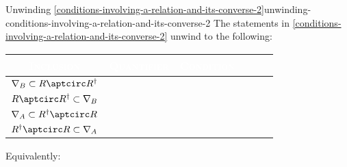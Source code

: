 \begin{remark}{Unwinding \cref{conditions-involving-a-relation-and-its-converse-2}}{unwinding-conditions-involving-a-relation-and-its-converse-2}%
    The statements in \cref{conditions-involving-a-relation-and-its-converse-2} unwind to the following:
    \begingroup%
    \setlength\cellspacetoplimit{3pt}
    \setlength\cellspacebottomlimit{3pt}
    \renewcommand{\arraystretch}{1.2}
    \begin{center}
        \begin{tabular}{|Sc|Sc|Sc|}\hline{}
            \textcolor{white}{\textbf{\textsc{Inclusion}}}       & \textcolor{white}{\textbf{\textsc{Quantifier}}}         & \textcolor{white}{\textbf{\textsc{Condition}}}                                                                             \\\hline{}
            $\nabla_{B}           \subset R\aptcirc R^{\dagger}$ &  &  \\
            $R\aptcirc R^{\dagger}\subset \nabla_{B}$            &  &          \\
            $\nabla_{A}           \subset R^{\dagger}\aptcirc R$ &  &  \\
            $R^{\dagger}\aptcirc R\subset \nabla_{A}$            &  &          \\\hline
        \end{tabular}
    \end{center}
    \endgroup
    Equivalently:
    \begin{envfootnotesize}

\end{envfootnotesize}
\end{remark}
